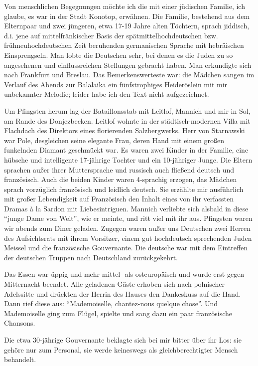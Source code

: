 Von menschlichen Begegnungen möchte ich die mit einer jüdischen Familie, ich glaube, es war in der Stadt Konotop, erwähnen. Die Familie, bestehend aus dem Elternpaar und zwei jüngeren, etwa 17-19 Jahre alten Töchtern, sprach jiddisch, d.i. jene auf mittelfränkischer Basis der spätmittelhochdeutschen bzw. frühneuhochdeutschen Zeit beruhenden germanischen Sprache mit hebräischen Einsprengseln. Man lobte die Deutschen sehr, bei denen es die Juden zu so angesehenen und einflussreichen Stellungen gebracht haben. Man erkundigte sich nach Frankfurt und Breslau. Das Bemerkenswerteste war: die Mädchen sangen im Verlauf des Abends zur Balalaika ein fünfstrophiges Heideröslein mit mir unbekannter Melodie; leider habe ich den Text nicht aufgezeichnet.

Um Pfingsten herum lag der Bataillonsstab mit Leitlof, Mannich und mir in Sol, am Rande des Donjezbecken. Leitlof wohnte in der städtisch-modernen Villa mit Flachdach des Direktors eines florierenden Salzbergwerks. Herr von Starnawski war Pole, desgleichen seine elegante Frau, deren Hand mit einem großen funkelnden Diamant geschmückt war. Es waren zwei Kinder in der Familie, eine hübsche und intelligente 17-jährige Tochter und ein 10-jähriger Junge. Die Eltern sprachen außer ihrer Muttersprache und russisch auch fließend deutsch und französisch. Auch die beiden Kinder waren 4-sprachig erzogen, das Mädchen sprach vorzüglich französisch und leidlich deutsch. Sie erzählte mir ausführlich mit großer Lebendigkeit auf Französisch den Inhalt eines von ihr verfassten Dramas à la Sardon mit Liebesintriguen. Mannich verliebte sich alsbald in diese \enquote{junge Dame von Welt}, wie er meinte, und ritt viel mit ihr aus. Pfingsten waren wir abends zum Diner geladen. Zugegen waren außer uns Deutschen zwei Herren des Aufsichtsrats mit ihrem Vorsitzer, einem gut hochdeutsch sprechenden Juden Meissel und die französische Gouvernante. Die deutsche war mit dem Eintreffen der deutschen Truppen nach Deutschland zurückgekehrt.

Das Essen war üppig und mehr mittel- als osteuropäisch und wurde erst gegen Mitternacht beendet. Alle geladenen Gäste erhoben sich nach polnischer Adelssitte und drückten der Herrin des Hauses den Dankeskuss auf die Hand. Dann rief diese aus: \enquote{Mademoiselle, chantez-nous quelque chose}. Und Mademoiselle ging zum Flügel, spielte und sang dazu ein paar französische Chansons.

Die etwa 30-jährige Gouvernante beklagte sich bei mir bitter über ihr Los: sie gehöre nur zum Personal, sie werde keineswegs als gleichberechtigter Mensch behandelt.

